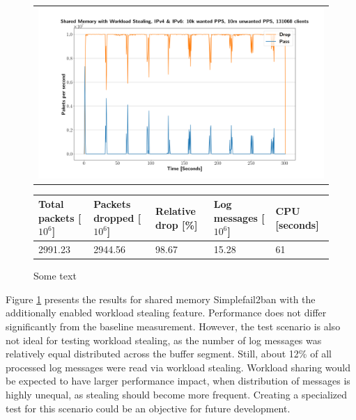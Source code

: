 \begin{figure}[!h]
	\centering
	\scriptsize
	\begin{tabular}{c}
    	\centerline{\includegraphics[width=1.2\textwidth]{images/simplefail2ban_shm_ws_ipv46_v10k_iv10m_c131068.png}}
	\end{tabular}
	\begin{tabular}{lllll}
		\toprule
		\textbf{Total packets [$10^6$]} & \textbf{Packets dropped [$10^6$]} & \textbf{Relative drop [\%]} & \textbf{Log messages [$10^6$]} & \textbf{CPU [seconds]} \\ \midrule 
		2991.23 & 2944.56 & 98.67 & 15.28 & 61 \\
		\bottomrule
	\end{tabular}
	\caption[Simplefail2ban, Shared Memory with Workload Sharing]{Some text}
	\label{fig:simplefail2ban:shm:ws}
\end{figure}

Figure \ref{fig:simplefail2ban:shm:ws} presents the results for shared memory Simplefail2ban with the additionally enabled workload stealing feature. Performance does not differ significantly from the baseline measurement. However,
the test scenario is also not ideal for testing workload stealing, as the number of log messages was relatively equal distributed across the buffer segment. Still, about 12\% of all processed log messages were
read via workload stealing. Workload sharing would be expected to have 
larger performance impact, when distribution of messages is highly unequal, as stealing should become more frequent. Creating a specialized test for this scenario could be an objective for future development. 

